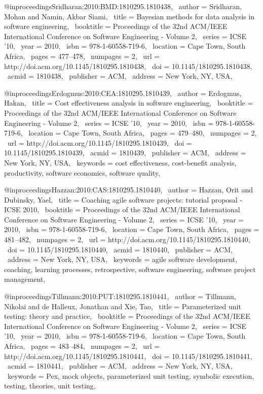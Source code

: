 @inproceedings{Sridharan:2010:BMD:1810295.1810438,
 author = {Sridharan, Mohan and Namin, Akbar Siami},
 title = {Bayesian methods for data analysis in software engineering},
 booktitle = {Proceedings of the 32nd ACM/IEEE International Conference on Software Engineering - Volume 2},
 series = {ICSE '10},
 year = {2010},
 isbn = {978-1-60558-719-6},
 location = {Cape Town, South Africa},
 pages = {477--478},
 numpages = {2},
 url = {http://doi.acm.org/10.1145/1810295.1810438},
 doi = {10.1145/1810295.1810438},
 acmid = {1810438},
 publisher = {ACM},
 address = {New York, NY, USA},
} 

@inproceedings{Erdogmus:2010:CEA:1810295.1810439,
 author = {Erdogmus, Hakan},
 title = {Cost effectiveness analysis in software engineering},
 booktitle = {Proceedings of the 32nd ACM/IEEE International Conference on Software Engineering - Volume 2},
 series = {ICSE '10},
 year = {2010},
 isbn = {978-1-60558-719-6},
 location = {Cape Town, South Africa},
 pages = {479--480},
 numpages = {2},
 url = {http://doi.acm.org/10.1145/1810295.1810439},
 doi = {10.1145/1810295.1810439},
 acmid = {1810439},
 publisher = {ACM},
 address = {New York, NY, USA},
 keywords = {cost effectiveness, cost-benefit analysis, productivity, software economics, software quality},
} 

@inproceedings{Hazzan:2010:CAS:1810295.1810440,
 author = {Hazzan, Orit and Dubinsky, Yael},
 title = {Coaching agile software projects: tutorial proposal - ICSE 2010},
 booktitle = {Proceedings of the 32nd ACM/IEEE International Conference on Software Engineering - Volume 2},
 series = {ICSE '10},
 year = {2010},
 isbn = {978-1-60558-719-6},
 location = {Cape Town, South Africa},
 pages = {481--482},
 numpages = {2},
 url = {http://doi.acm.org/10.1145/1810295.1810440},
 doi = {10.1145/1810295.1810440},
 acmid = {1810440},
 publisher = {ACM},
 address = {New York, NY, USA},
 keywords = {agile software development, coaching, learning processes, retrospective, software engineering, software project management},
} 

@inproceedings{Tillmann:2010:PUT:1810295.1810441,
 author = {Tillmann, Nikolai and de Halleux, Jonathan and Xie, Tao},
 title = {Parameterized unit testing: theory and practice},
 booktitle = {Proceedings of the 32nd ACM/IEEE International Conference on Software Engineering - Volume 2},
 series = {ICSE '10},
 year = {2010},
 isbn = {978-1-60558-719-6},
 location = {Cape Town, South Africa},
 pages = {483--484},
 numpages = {2},
 url = {http://doi.acm.org/10.1145/1810295.1810441},
 doi = {10.1145/1810295.1810441},
 acmid = {1810441},
 publisher = {ACM},
 address = {New York, NY, USA},
 keywords = {Pex, mock objects, parameterized unit testing, symbolic execution, testing, theories, unit testing},
} 

